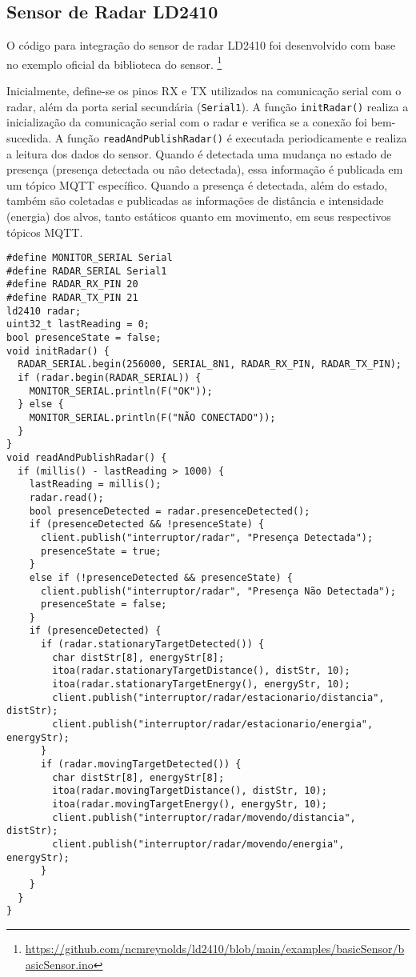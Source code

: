 \documentclass[]{abntex2}
\begin{document}
\subsection{Sensor de Radar LD2410}

O código para integração do sensor de radar LD2410 foi desenvolvido com base no
exemplo oficial da biblioteca do sensor.
\footnote{\url{https://github.com/ncmreynolds/ld2410/blob/main/examples/basicSensor/basicSensor.ino}}

Inicialmente, define-se os pinos RX e TX utilizados na comunicação serial com o
radar, além da porta serial secundária (\texttt{Serial1}). A função
\texttt{initRadar()} realiza a inicialização da comunicação serial com o radar e
verifica se a conexão foi bem-sucedida. A função \texttt{readAndPublishRadar()}
é executada periodicamente e realiza a leitura dos dados do sensor. Quando é
detectada uma mudança no estado de presença (presença detectada ou não
detectada), essa informação é publicada em um tópico MQTT específico. Quando a
presença é detectada, além do estado, também são coletadas e publicadas as
informações de distância e intensidade (energia) dos alvos, tanto estáticos
quanto em movimento, em seus respectivos tópicos MQTT.
\clearpage
\begin{verbatim}
#define MONITOR_SERIAL Serial
#define RADAR_SERIAL Serial1
#define RADAR_RX_PIN 20
#define RADAR_TX_PIN 21
ld2410 radar;
uint32_t lastReading = 0;
bool presenceState = false;
void initRadar() {
  RADAR_SERIAL.begin(256000, SERIAL_8N1, RADAR_RX_PIN, RADAR_TX_PIN);
  if (radar.begin(RADAR_SERIAL)) {
    MONITOR_SERIAL.println(F("OK"));
  } else {
    MONITOR_SERIAL.println(F("NÃO CONECTADO"));
  }
}
void readAndPublishRadar() {
  if (millis() - lastReading > 1000) {
    lastReading = millis();
    radar.read();
    bool presenceDetected = radar.presenceDetected();
    if (presenceDetected && !presenceState) {
      client.publish("interruptor/radar", "Presença Detectada");
      presenceState = true;
    }
    else if (!presenceDetected && presenceState) {
      client.publish("interruptor/radar", "Presença Não Detectada");
      presenceState = false;
    }
    if (presenceDetected) {
      if (radar.stationaryTargetDetected()) {
        char distStr[8], energyStr[8];
        itoa(radar.stationaryTargetDistance(), distStr, 10);
        itoa(radar.stationaryTargetEnergy(), energyStr, 10);
        client.publish("interruptor/radar/estacionario/distancia", distStr);
        client.publish("interruptor/radar/estacionario/energia", energyStr);
      }
      if (radar.movingTargetDetected()) {
        char distStr[8], energyStr[8];
        itoa(radar.movingTargetDistance(), distStr, 10);
        itoa(radar.movingTargetEnergy(), energyStr, 10);
        client.publish("interruptor/radar/movendo/distancia", distStr);
        client.publish("interruptor/radar/movendo/energia", energyStr);
      }
    }
  }
}
\end{verbatim}
\end{document}
